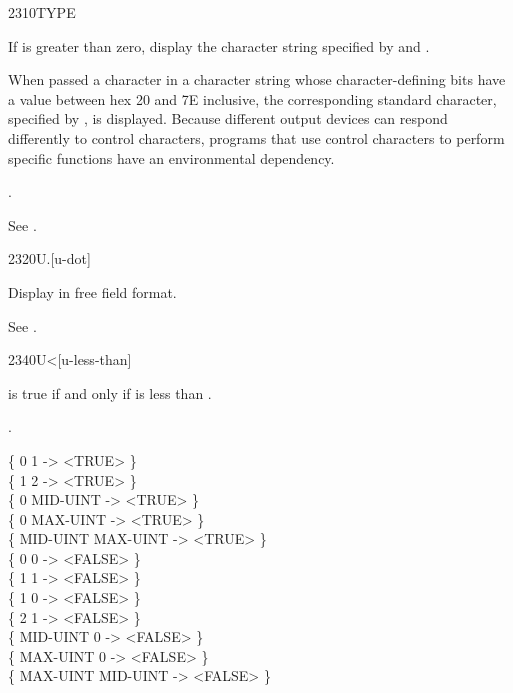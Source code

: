 \begin{worddef}{2310}{TYPE}
\item {}

	If  is greater than zero, display the character string
	specified by  and .

	When passed a character in a character string whose
	character-defining bits have a value between hex 20 and 7E
	inclusive, the corresponding standard character, specified
	by , is displayed.
	Because different output devices can respond differently to
	control characters, programs that use control characters to
	perform specific functions have an environmental dependency.

\see {}.

	\begin{defer}
	\testing\rmfamily
		See .
	\end{defer}
\end{worddef}


\begin{worddef}[Ud]{2320}{U.{}}[u-dot]
\item {}

	Display  in free field format.

	\begin{defer}
	\testing\rmfamily
		See \rref{core:EMIT}{EMIT}.
	\end{defer}
\end{worddef}


\begin{worddef}[Uless]{2340}{U<}[u-less-than]
\item {}

	 is true if and only if  is less than
	\param{u_2}.

\see {}.

	\begin{defer}
	\testing
		\{        0        1  -> <TRUE>  \} \\
		\{        1        2  -> <TRUE>  \} \\
		\{        0 MID-UINT  -> <TRUE>  \} \\
		\{        0 MAX-UINT  -> <TRUE>  \} \\
		\{ MID-UINT MAX-UINT  -> <TRUE>  \} \\
		\{        0        0  -> <FALSE> \} \\
		\{        1        1  -> <FALSE> \} \\
		\{        1        0  -> <FALSE> \} \\
		\{        2        1  -> <FALSE> \} \\
		\{ MID-UINT        0  -> <FALSE> \} \\
		\{ MAX-UINT        0  -> <FALSE> \} \\
		\{ MAX-UINT MID-UINT  -> <FALSE> \}
	\end{defer}
\end{worddef}


